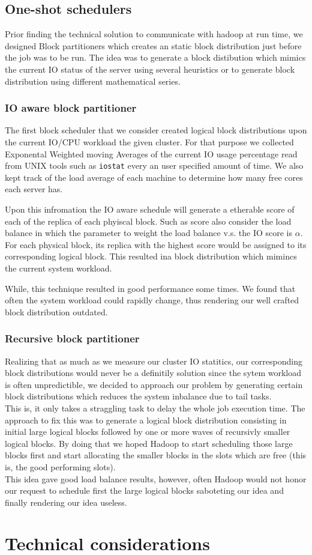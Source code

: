 \subsection{One-shot schedulers}
Prior finding the technical solution to communicate with hadoop at run time, we designed Block partitioners which creates an static block distribution just before the job was to be run. The idea was to generate a block distibution which mimics the current IO status of the server using several heuristics or to generate block distribution using different mathematical series.

\subsubsection{IO aware block partitioner}
The first block scheduler that we consider created logical block distributions upon the current IO/CPU workload the given cluster. For that purpose we collected Exponental Weighted moving Averages of the current IO usage percentage read from UNIX tools such as \texttt{iostat} every an user specified amount of time. We also kept track of the load average of each machine to determine how many free cores each server has.

Upon this infromation the IO aware schedule will generate a etherable score of each of the replica of each phyiscal block. Such as score also consider the load balance in which the parameter to weight the load balance v.s. the IO score is $\alpha$.
For each physical block, its replica with the highest score would be assigned to its corresponding logical block. This resulted ina block distribution which mimincs the current system workload. 

While, this technique resulted in good performance some times. We found that often the system workload could rapidly change, thus rendering our well crafted block distribution outdated.

\subsubsection{Recursive block partitioner}
Realizing that as much as we measure our cluster IO statitics, our corresponding block distributions would never be a definitily solution since the sytem workload is often unpredictible, we decided to approach our problem by generating certain block distributions which reduces the system inbalance due to tail tasks. \\
This is, it only takes a straggling task to delay the whole job execution time. The approach to fix this was to generate a logical block distribution consisting in initial large logical blocks followed by one or more waves of recursivly smaller logical blocks. By doing that we hoped Hadoop to start scheduling those large blocks first and start allocating the smaller blocks in the slots which are free (this is, the good performing slots). \\
This idea gave good load balance results, however, often Hadoop would not honor our request to schedule first the large logical blocks saboteting our idea and finally rendering our idea useless.

\section{Technical considerations}
\lipsum[10]
